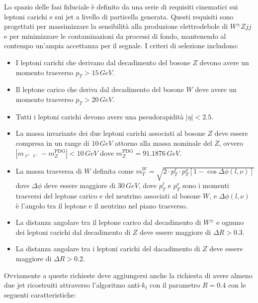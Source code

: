 \documentclass[11pt]{article}
\begin{document}
Lo spazio delle fasi fiduciale è definito da una serie di requisiti cinematici sui leptoni carichi e sui jet a livello di particella generata. Questi requisiti sono progettati per massimizzare la sensibilità alla produzione elettrodebole di $W^\pm Zjj$ e per minimizzare le contaminazioni da processi di fondo, mantenendo al contempo un'ampia accettanza per il segnale. I criteri di selezione includono:
\begin{itemize}
    \item I leptoni carichi che derivano dal decadimento del bosone $Z$ devono avere un momento trasverso $p_T>15\,\unit{GeV}$.
    \item Il leptone carico che deriva dal decadimento del bosone $W$ deve avere un momento trasverso $p_T>20\,\unit{GeV}$.
    \item Tutti i leptoni carichi devono avere una pseudorapidità $|\eta| < 2.5$.
    \item La massa invariante dei due leptoni carichi associati al bosone $Z$ deve essere compresa in un range di $10\,\unit{GeV}$ attorno alla massa nominale del $Z$, ovvero $|m_{\ell^+ \ell^-} - m_Z^{\textrm{PDG}}| < 10\,\unit{GeV}$ dove $m_Z^{\textrm{PDG}}=91.1876\,\unit{GeV}$.
    \item La massa trasversa di $W$ definita come $m_T^W = \sqrt{2\cdot p_T^\ell \cdot p_T^{\nu} [1 - \cos\Delta\phi(l,\nu)]}$ dove $\Delta\phi$ deve essere maggiore di $30\,\unit{GeV}$, dove $p_T^\ell$ e $p_T^{\nu}$ sono i momenti trasversi del leptone carico e del neutrino associati al bosone $W$, e $\Delta\phi(l,\nu)$ è l'angolo tra il leptone e il neutrino nel piano trasverso.
    \item La distanza angolare tra il leptone carico dal decadimento di $W^\pm$ e ognuno dei leptoni carichi dal decadimento di $Z$ deve essere maggiore di $\Delta R > 0.3$.
    \item La distanza angolare tra i leptoni carichi del dacadimento di $Z$ deve essere maggiore di $\Delta R > 0.2$.
\end{itemize}
Ovviamente a queste richieste deve aggiungersi anche la richiesta di avere almeno due jet ricostruiti attraverso l'algoritmo anti-$k_t$ con il parametro $R=0.4$ con le seguenti caratteristiche:
\end{document}
